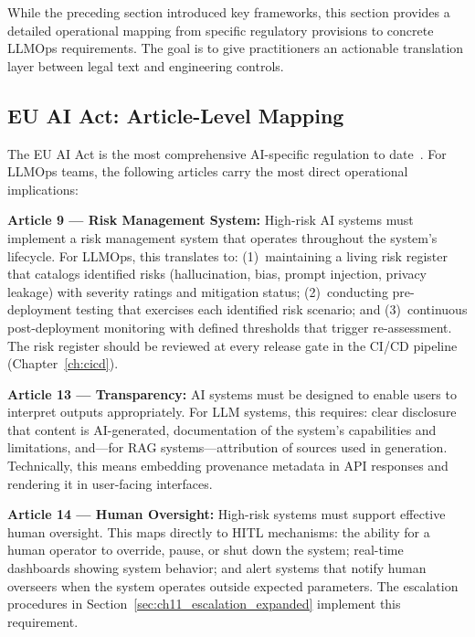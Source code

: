 While the preceding section introduced key frameworks, this section provides a detailed operational mapping from specific regulatory provisions to concrete LLMOps requirements. The goal is to give practitioners an actionable translation layer between legal text and engineering controls.

\subsection{EU AI Act: Article-Level Mapping}\label{sec:ch11_euaiact}

The EU AI Act is the most comprehensive AI-specific regulation to date~\cite{euai2025}. For LLMOps teams, the following articles carry the most direct operational implications:

\textbf{Article 9 --- Risk Management System:} High-risk AI systems must implement a risk management system that operates throughout the system's lifecycle. For LLMOps, this translates to: (1)~maintaining a living risk register that catalogs identified risks (hallucination, bias, prompt injection, privacy leakage) with severity ratings and mitigation status; (2)~conducting pre-deployment testing that exercises each identified risk scenario; and (3)~continuous post-deployment monitoring with defined thresholds that trigger re-assessment. The risk register should be reviewed at every release gate in the CI/CD pipeline (Chapter~\ref{ch:cicd}).

\textbf{Article 13 --- Transparency:} AI systems must be designed to enable users to interpret outputs appropriately. For LLM systems, this requires: clear disclosure that content is AI-generated, documentation of the system's capabilities and limitations, and---for RAG systems---attribution of sources used in generation. Technically, this means embedding provenance metadata in API responses and rendering it in user-facing interfaces.

\textbf{Article 14 --- Human Oversight:} High-risk systems must support effective human oversight. This maps directly to HITL mechanisms: the ability for a human operator to override, pause, or shut down the system; real-time dashboards showing system behavior; and alert systems that notify human overseers when the system operates outside expected parameters. The escalation procedures in Section~\ref{sec:ch11_escalation_expanded} implement this requirement.

